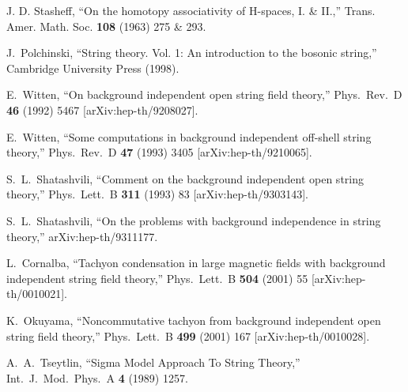 \documentclass[a4paper,11pt]{article}               \def\new#1\endnew{{\bf #1}}
\begin{document}
J. D. Stasheff, 
``On the homotopy associativity of H-spaces, I. \& II.,'' 
Trans. Amer. Math. Soc. {\bf 108} (1963) 275 \& 293.

J.~Polchinski,
``String theory. Vol. 1: An introduction to the bosonic string,''
Cambridge University Press (1998).

E.~Witten,
``On background independent open string field theory,''
Phys.\ Rev.\ D {\bf 46} (1992) 5467
[arXiv:hep-th/9208027].

E.~Witten,
``Some computations in background independent off-shell string theory,''
Phys.\ Rev.\ D {\bf 47} (1993) 3405
[arXiv:hep-th/9210065].

S.~L.~Shatashvili,
``Comment on the background independent open string theory,''
Phys.\ Lett.\ B {\bf 311} (1993) 83
[arXiv:hep-th/9303143].

S.~L.~Shatashvili,
``On the problems with background independence in string theory,''
arXiv:hep-th/9311177.

L.~Cornalba,
``Tachyon condensation in large magnetic fields with background  
independent string field theory,''
Phys.\ Lett.\ B {\bf 504} (2001) 55
[arXiv:hep-th/0010021].

K.~Okuyama,
``Noncommutative tachyon from background independent open string field 
theory,''
Phys.\ Lett.\ B {\bf 499} (2001) 167
[arXiv:hep-th/0010028].

A.~A.~Tseytlin,
``Sigma Model Approach To String Theory,''
Int.\ J.\ Mod.\ Phys.\ A {\bf 4} (1989) 1257.
\end{document}
